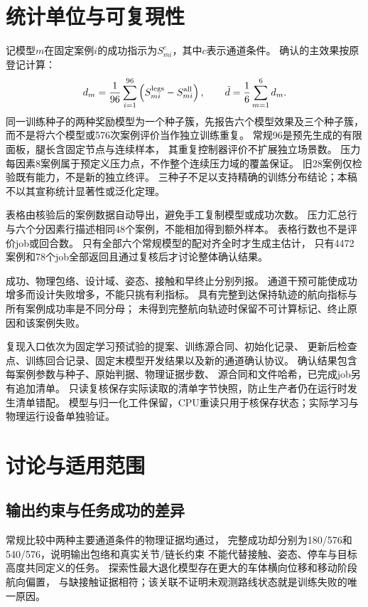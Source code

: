 \documentclass[UTF8,a4paper,11pt]{ctexart}
\begin{document}
\section{统计单位与可复現性}
记模型$m$在固定案例$i$的成功指示为$S_{mi}^{c}$，其中$c$表示通道条件。
确认的主效果按原登记计算：
\begin{equation}
 d_m=\frac{1}{96}\sum_{i=1}^{96}
       \left(S_{mi}^{\rm legs}-S_{mi}^{\rm all}\right),\qquad
 \bar d=\frac{1}{6}\sum_{m=1}^{6}d_m.
\end{equation}
同一训练种子的两种奖励模型为一个种子簇，先报告六个模型效果及三个种子簇，
而不是将六个模型或576次案例评价当作独立训练重复。
常规96是预先生成的有限面板，腿长含固定节点与连续样本，
其重复控制器评价不扩展独立场景数。
压力每因素8案例属于预定义压力点，不作整个连续压力域的覆盖保证。
旧28案例仅检验既有能力，不是新的独立终评。
三种子不足以支持精确的训练分布结论；本稿不以其宣称统计显著性或泛化定理。

表格由核验后的案例数据自动导出，避免手工复制模型或成功次数。
压力汇总行与六个分因素行描述相同48个案例，不能相加得到额外样本。
表格行数也不是评价job或回合数。
只有全部六个常规模型的配对齐全时才生成主估计，
只有4472案例和78个job全部返回且通过复核后才讨论整体确认结果。

成功、物理包络、设计域、姿态、接触和早终止分别列报。
通道干预可能使成功增多而设计失败增多，不能只挑有利指标。
具有完整到达保持轨迹的航向指标与所有案例成功率是不同分母；
未得到完整航向轨迹时保留不可计算标记、终止原因和该案例失败。

复现入口依次为固定学习预试验的提案、训练源合同、初始化记录、
更新后检查点、训练回合记录、固定末模型开发结果以及新的通道确认协议。
确认结果包含每案例参数与种子、原始判据、物理证据步数、
源合同和文件哈希，已完成job另有追加清单。
只读复核保存实际读取的清单字节快照，防止生产者仍在运行时发生清单错配。
模型与归一化工件保留，CPU重读只用于核保存状态；实际学习与物理运行设备单独验证。

\section{讨论与适用范围}
\subsection{输出约束与任务成功的差异}
常规比较中两种主要通道条件的物理证据均通过，
完整成功却分别为180/576和540/576，说明输出包络和真实关节/链长约束
不能代替接触、姿态、停车与目标高度共同定义的任务。
探索性最大退化模型存在更大的车体横向位移和移动阶段航向偏置，
与缺接触证据相符；该关联不证明未观测路线状态就是训练失败的唯一原因。
\end{document}
